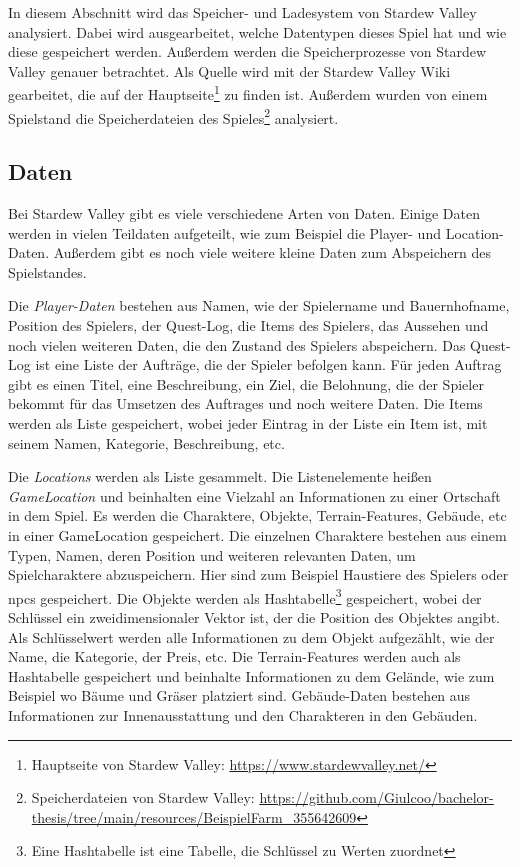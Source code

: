 In diesem Abschnitt wird das Speicher- und Ladesystem von Stardew Valley analysiert. Dabei wird ausgearbeitet, welche Datentypen dieses Spiel hat und wie diese gespeichert werden. Außerdem werden die Speicherprozesse von Stardew Valley genauer betrachtet. Als Quelle wird mit der Stardew Valley Wiki gearbeitet, die auf der Hauptseite\footnote{Hauptseite von Stardew Valley: \url{https://www.stardewvalley.net/}} zu finden ist. Außerdem wurden von einem Spielstand die Speicherdateien des Spieles\footnote{\label{stardewvalleySavefiles}Speicherdateien von Stardew Valley: \url{https://github.com/Giulcoo/bachelor-thesis/tree/main/resources/BeispielFarm_355642609}} analysiert.



\subsection{Daten}
Bei Stardew Valley gibt es viele verschiedene Arten von Daten. Einige Daten werden in vielen Teildaten aufgeteilt, wie zum Beispiel die Player- und Location-Daten. Außerdem gibt es noch viele weitere kleine Daten zum Abspeichern des Spielstandes.

Die \textit{Player-Daten} bestehen aus Namen, wie der Spielername und Bauernhofname, Position des Spielers, der Quest-Log, die Items des Spielers, das Aussehen und noch vielen weiteren Daten, die den Zustand des Spielers abspeichern. Das Quest-Log ist eine Liste der Aufträge, die der Spieler befolgen kann. Für jeden Auftrag gibt es einen Titel, eine Beschreibung, ein Ziel, die Belohnung, die der Spieler bekommt für das Umsetzen des Auftrages und noch weitere Daten. Die Items werden als Liste gespeichert, wobei jeder Eintrag in der Liste ein Item ist, mit seinem Namen, Kategorie, Beschreibung, \ac{etc}. 

Die \textit{Locations} werden als Liste gesammelt. Die Listenelemente heißen \textit{GameLocation} und beinhalten eine Vielzahl an Informationen zu einer Ortschaft in dem Spiel. Es werden die Charaktere, Objekte, Terrain-Features, Gebäude, \ac{etc} in einer GameLocation gespeichert. Die einzelnen Charaktere bestehen aus einem Typen, Namen, deren Position und weiteren relevanten Daten, um Spielcharaktere abzuspeichern. Hier sind zum Beispiel Haustiere des Spielers oder \acp{npc} gespeichert. Die Objekte werden als Hashtabelle\footnote{Eine Hashtabelle ist eine Tabelle, die Schlüssel zu Werten zuordnet} gespeichert, wobei der Schlüssel ein zweidimensionaler Vektor ist, der die Position des Objektes angibt. Als Schlüsselwert werden alle Informationen zu dem Objekt aufgezählt, wie der Name, die Kategorie, der Preis, \ac{etc}. Die Terrain-Features werden auch als Hashtabelle gespeichert und beinhalte Informationen zu dem Gelände, wie zum Beispiel wo Bäume und Gräser platziert sind. Gebäude-Daten bestehen aus Informationen zur Innenausstattung und den Charakteren in den Gebäuden.


